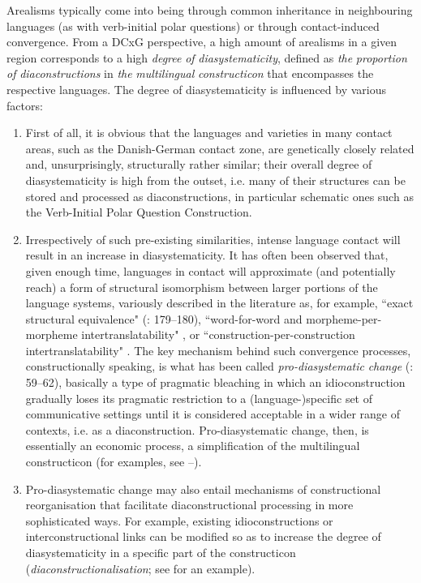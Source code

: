 \documentclass[output=paper]{langsci/langscibook}
\begin{document}
Arealisms typically come into being through common inheritance in neighbouring languages (as with verb-initial polar questions) or through contact-induced convergence. From a DCxG perspective, a high amount of arealisms in a given region corresponds to a high \textit{degree} \textit{of} \textit{diasystematicity}, defined as \textit{the} \textit{proportion} \textit{of} \textit{diaconstructions} in \textit{the} \textit{multilingual} \textit{constructicon} that encompasses the respective languages. The degree of diasystematicity is influenced by various factors:

\begin{enumerate}
 \item First of all, it is obvious that the languages and varieties in many contact areas, such as the Danish-German contact zone, are genetically closely related and, unsurprisingly, structurally rather similar; their overall degree of diasystematicity is high from the outset, i.e. many of their structures can be stored and processed as diaconstructions, in particular schematic ones such as the Verb-Initial Polar Question Construction.

 \item Irrespectively of such pre-existing similarities, intense language contact will result in an increase in diasystematicity. It has often been observed that, given enough time, languages in contact will approximate (and potentially reach) a form of structural isomorphism between larger portions of the language systems, variously described in the literature as, for example, “exact structural equivalence" (\citealt{Heine.2005}: 179--180), “word-for-word and morpheme-per-morpheme intertranslatability" \citep[28]{Aikhenvald.2006}, or “construction-per-construction intertranslatability" \citep[149]{Hoder.2014}. The key mechanism behind such convergence processes, constructionally speaking, is what has been called \textit{pro-diasystematic} \textit{change} (\citealt{Hoder.2018}: 59--62), basically a type of pragmatic bleaching in which an idioconstruction gradually loses its pragmatic restriction to a (language-)specific set of communicative settings until it is considered acceptable in a wider range of contexts, i.e. as a diaconstruction. Pro-diasystematic change, then, is essentially an economic process, a simplification of the multilingual constructicon (for examples, see --).

 \item Pro-diasystematic change may also entail mechanisms of constructional reorganisation that facilitate diaconstructional processing in more sophisticated ways. For example, existing idioconstructions or interconstructional links can be modified so as to increase the degree of diasystematicity in a specific part of the constructicon (\textit{diaconstructionalisation}; see  for an example).


\end{enumerate}
\end{document}
